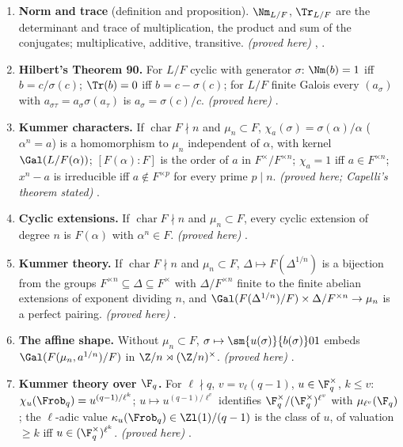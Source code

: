 \begin{enumerate}[label=\textbf{\thechapter.\arabic*}]
\item \textbf{Norm and trace} (definition and proposition). $\Nm_{L/F}$, $\Tr_{L/F}$ are the determinant and trace of multiplication, the product and
sum of the conjugates; multiplicative, additive, transitive. \emph{(proved here)} , .
\item \textbf{Hilbert's Theorem 90.} For $L/F$ cyclic with generator $\sigma$: $\Nm(b)=1$ iff $b=c/\sigma(c)$; $\Tr(b)=0$ iff $b=c-\sigma(c)$; for
$L/F$ finite Galois every $(a_\sigma)$ with $a_{\sigma\tau}=a_\sigma\sigma(a_\tau)$ is $a_\sigma=\sigma(c)/c$. \emph{(proved here)} .
\item \textbf{Kummer characters.} If $\operatorname{char}F\nmid n$ and $\mu_n\subset F$, $\chi_a(\sigma)=\sigma(\alpha)/\alpha$ ($\alpha^n=a$) is a
homomorphism to $\mu_n$ independent of $\alpha$, with kernel $\Gal(L/F(\alpha))$; $[F(\alpha):F]$ is the order of $a$ in $F^\times/F^{\times n}$;
$\chi_a=1$ iff $a\in F^{\times n}$; $x^n-a$ is irreducible iff $a\notin F^{\times p}$ for every prime $p\mid n$. \emph{(proved here; Capelli's theorem
stated)} .
\item \textbf{Cyclic extensions.} If $\operatorname{char}F\nmid n$ and $\mu_n\subset F$, every cyclic extension of degree $n$ is $F(\alpha)$ with
$\alpha^n\in F$. \emph{(proved here)} .
\item \textbf{Kummer theory.} If $\operatorname{char}F\nmid n$ and $\mu_n\subset F$, $\Delta\mapsto F(\Delta^{1/n})$ is a bijection from the groups
$F^{\times n}\subseteq\Delta\subseteq F^\times$ with $\Delta/F^{\times n}$ finite to the finite abelian extensions of exponent dividing $n$, and
$\Gal(F(\Delta^{1/n})/F)\times\Delta/F^{\times n}\to\mu_n$ is a perfect pairing. \emph{(proved here)} .
\item \textbf{The affine shape.} Without $\mu_n\subset F$, $\sigma\mapsto\sm{u(\sigma)}{b(\sigma)}01$ embeds $\Gal(F(\mu_n,a^{1/n})/F)$ in
$\Z/n\rtimes(\Z/n)^\times$. \emph{(proved here)} .
\item \textbf{Kummer theory over $\F_q$.} For $\ell\nmid q$, $v=v_\ell(q-1)$, $u\in\F_q^\times$, $k\le v$: $\chi_u(\Frob_q)=u^{(q-1)/\ell^k}$; $u\mapsto
u^{(q-1)/\ell^v}$ identifies $\F_q^\times/(\F_q^\times)^{\ell^v}$ with $\mu_{\ell^v}(\F_q)$; the $\ell$-adic value $\kappa_u(\Frob_q)\in\Zl(1)/(q-1)$ is the class
of $u$, of valuation $\ge k$ iff $u\in(\F_q^\times)^{\ell^k}$. \emph{(proved here)} .

\end{enumerate}
